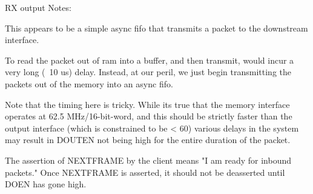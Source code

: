 RX output Notes: 

This appears to be a simple async fifo that transmits a packet to the
downstream interface.

To read the packet out of ram into a buffer, and then transmit, would
incur a very long (~10 us) delay. Instead, at our peril, we just begin
transmitting the packets out of the memory into an async fifo. 

Note that the timing here is tricky. While its true that the memory
interface operates at 62.5 MHz/16-bit-word, and this should be
strictly faster than the output interface (which is constrained to be
< 60) various delays in the system may result in DOUTEN not being high
for the entire duration of the packet.


The assertion of NEXTFRAME by the client means "I am ready for inbound
packets." Once NEXTFRAME is asserted, it should not be deasserted
until DOEN has gone high.

